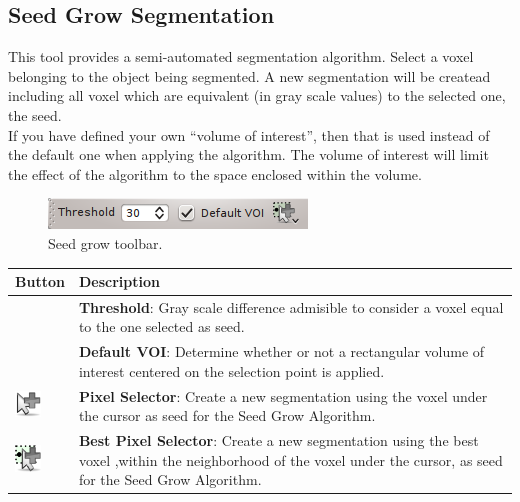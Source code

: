 \subsection{Seed Grow Segmentation}

This tool provides a semi-automated segmentation algorithm. Select a voxel
belonging to the object being segmented. A new segmentation will be createad
including all voxel which are equivalent (in gray scale values) to the selected
one, the seed.\\
If you have defined your own ``volume of interest'', then that is used instead of
the default one when applying the algorithm. The volume of interest will limit the
effect of the algorithm to the space enclosed within the volume.\\

\begin{figure}[H]
\centering
\includegraphics{fig/SeedGrowSegmentation}
\caption{Seed grow toolbar.}
\end{figure}
\vspace{0.3cm}

\begin{tabular}{| m{1.3cm} | m{12cm} |}
\hline
\textbf{Button} & \textbf{Description}\\
\hline
& %
\textbf{Threshold}: Gray scale difference admisible to consider a voxel equal to
the one selected as seed. \\
\hline
& %
\textbf{Default VOI}: Determine whether or not a rectangular volume of interest
centered on the selection point is applied.\\
\hline
\includegraphics[width=0.7cm]{../../frontend/toolbar/seedgrow/rsc/pixelSelector} &
\textbf{Pixel Selector}: Create a new segmentation using the voxel under the
cursor as seed for the Seed Grow Algorithm.\\
\hline
\includegraphics[width=0.7cm]{../../frontend/toolbar/seedgrow/rsc/bestPixelSelector} &
\textbf{Best Pixel Selector}: Create a new segmentation using the best voxel
,within the neighborhood of the voxel under the cursor, as seed for the Seed
Grow Algorithm. \\
\hline
\end{tabular}

